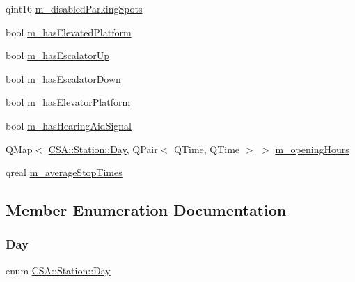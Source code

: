 \begin{DoxyCompactItemize}
\item 
qint16 \mbox{\hyperlink{classCSA_1_1Station_a76023bf63f30f57b722c7816742caa26}{m\+\_\+disabled\+Parking\+Spots}}
\item 
bool \mbox{\hyperlink{classCSA_1_1Station_a190b2f5b5df699b52e9319f1edfc65fb}{m\+\_\+has\+Elevated\+Platform}}
\item 
bool \mbox{\hyperlink{classCSA_1_1Station_a855114e1459342bb7d6e66eb2922ea69}{m\+\_\+has\+Escalator\+Up}}
\item 
bool \mbox{\hyperlink{classCSA_1_1Station_a9da4053b1055e4eb7de68f0c584aa2ff}{m\+\_\+has\+Escalator\+Down}}
\item 
bool \mbox{\hyperlink{classCSA_1_1Station_acc76b2fa0b1ca83cddd34c0914816ac2}{m\+\_\+has\+Elevator\+Platform}}
\item 
bool \mbox{\hyperlink{classCSA_1_1Station_ad52021cd3bdc9742fbec826af32d9821}{m\+\_\+has\+Hearing\+Aid\+Signal}}
\item 
Q\+Map$<$ \mbox{\hyperlink{classCSA_1_1Station_aa160d0de40db0583099b5986dea1cd67}{C\+S\+A\+::\+Station\+::\+Day}}, Q\+Pair$<$ Q\+Time, Q\+Time $>$ $>$ \mbox{\hyperlink{classCSA_1_1Station_ad822c4beb04f1b4739a4c17603e54bbb}{m\+\_\+opening\+Hours}}
\item 
qreal \mbox{\hyperlink{classCSA_1_1Station_a8ced92ad1d4e39e269435fcb7603c841}{m\+\_\+average\+Stop\+Times}}
\end{DoxyCompactItemize}


\subsection{Member Enumeration Documentation}
\mbox{\label{classCSA_1_1Station_aa160d0de40db0583099b5986dea1cd67}} 
\subsubsection{\texorpdfstring{Day}{Day}}
{\footnotesize\ttfamily enum \mbox{\hyperlink{classCSA_1_1Station_aa160d0de40db0583099b5986dea1cd67}{C\+S\+A\+::\+Station\+::\+Day}}\hspace{0.3cm}{\ttfamily [strong]}}


